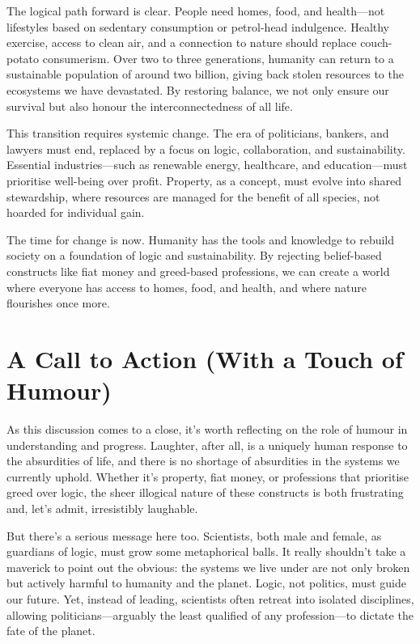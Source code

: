 \documentclass[12pt]{article}
\begin{document}
The logical path forward is clear. People need homes, food, and health—not lifestyles based on sedentary consumption or petrol-head indulgence. Healthy exercise, access to clean air, and a connection to nature should replace couch-potato consumerism. Over two to three generations, humanity can return to a sustainable population of around two billion, giving back stolen resources to the ecosystems we have devastated. By restoring balance, we not only ensure our survival but also honour the interconnectedness of all life.

This transition requires systemic change. The era of politicians, bankers, and lawyers must end, replaced by a focus on logic, collaboration, and sustainability. Essential industries—such as renewable energy, healthcare, and education—must prioritise well-being over profit. Property, as a concept, must evolve into shared stewardship, where resources are managed for the benefit of all species, not hoarded for individual gain.

The time for change is now. Humanity has the tools and knowledge to rebuild society on a foundation of logic and sustainability. By rejecting belief-based constructs like fiat money and greed-based professions, we can create a world where everyone has access to homes, food, and health, and where nature flourishes once more.

\section*{A Call to Action (With a Touch of Humour)}

As this discussion comes to a close, it’s worth reflecting on the role of humour in understanding and progress. Laughter, after all, is a uniquely human response to the absurdities of life, and there is no shortage of absurdities in the systems we currently uphold. Whether it’s property, fiat money, or professions that prioritise greed over logic, the sheer illogical nature of these constructs is both frustrating and, let’s admit, irresistibly laughable.

But there’s a serious message here too. Scientists, both male and female, as guardians of logic, must grow some metaphorical balls. It really shouldn’t take a maverick to point out the obvious: the systems we live under are not only broken but actively harmful to humanity and the planet. Logic, not politics, must guide our future. Yet, instead of leading, scientists often retreat into isolated disciplines, allowing politicians—arguably the least qualified of any profession—to dictate the fate of the planet.
\end{document}
